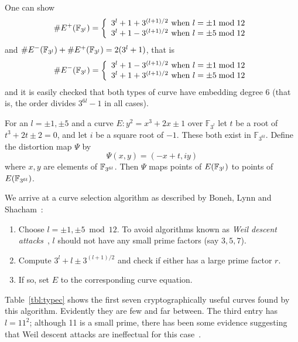 One can show
\[
\#E^+(\mathbb{F}_{3^l}) = \left \{ \begin{array}{rcl}
3^l + 1 + 3^{(l+1)/2} \mbox { when } l = \pm 1 \bmod 12 \\
3^l + 1 - 3^{(l+1)/2} \mbox { when } l = \pm 5 \bmod 12
\end{array} \right.
\]
and $\#E^-(\mathbb{F}_{3^l}) + \#E^+(\mathbb{F}_{3^l}) = 2(3^l + 1)$, that is
\[
\#E^-(\mathbb{F}_{3^l}) = \left \{ \begin{array}{rcl}
3^l + 1 - 3^{(l+1)/2} \mbox { when } l = \pm 1 \bmod 12 \\
3^l + 1 + 3^{(l+1)/2} \mbox { when } l = \pm 5 \bmod 12
\end{array} \right.
\]
and it is easily checked that both types of curve have embedding
degree 6 (that is, the order divides $3^{6l} -1$ in all cases).

For an $l = \pm 1, \pm 5$ and a
curve $E : y^2 = x^3 + 2 x \pm 1$ over $\mathbb{F}_{3^l}$
let $t$ be a root of $t^3 + 2t \pm 2 = 0$, and let $i$ be a
square root of $-1$. These both exist in $\mathbb{F}_{3^{6l}}$.
Define the distortion map $\Psi$ by
\[ \Psi(x,y) = (-x + t, i y) \]
where $x, y$ are elements of $\mathbb{F}_{3^{6l}}$. Then $\Psi$ maps points
of $E(\mathbb{F}_{3^l})$ to points of $E(\mathbb{F}_{3^{6l}})$.

We arrive at a curve selection algorithm as described by
Boneh, Lynn and Shacham~\cite{bls}:

\begin{enumerate}
\item
Choose $l = \pm 1, \pm 5 \bmod 12$. To avoid algorithms known as
\emph{Weil descent attacks}~\cite{weildescent1, weildescent2},
$l$ should not have any small prime factors (say $3,5,7$).
\item
Compute $3^l + l \pm 3^{(l+1)/2}$ and check if either has a large prime
factor $r$.
\item
If so, set $E$ to the corresponding curve equation.
\end{enumerate}

Table~\ref{tbl:typec} shows the first seven cryptographically useful curves
found by this algorithm. Evidently they are few and far between.
The third entry has $l = 11^2$; although 11 is a small
prime, there has been some evidence suggesting that Weil descent attacks
are ineffectual for this case~\cite{ghsonodd}.

